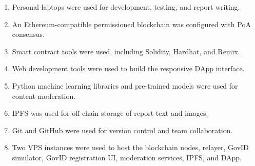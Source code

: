 \begin{enumerate}
    \item Personal laptops were used for development, testing, and report writing.

    \item An Ethereum-compatible permissioned blockchain was configured with \ac{PoA} consensus.

    \item Smart contract tools were used, including Solidity, Hardhat, and Remix.

    \item Web development tools were used to build the responsive \ac{DApp} interface.

    \item Python machine learning libraries and pre-trained models were used for content moderation.

    \item \ac{IPFS} was used for off-chain storage of report text and images.

    \item Git and GitHub were used for version control and team collaboration.
    
    \item Two \ac{VPS} instances were used to host the blockchain nodes, relayer, GovID simulator, GovID registration \ac{UI}, moderation services, \ac{IPFS}, and \ac{DApp}.
\end{enumerate}







